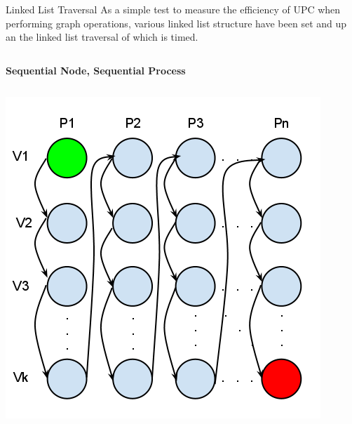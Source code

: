 \documentclass[final]{beamer} %
\begin{document}
\begin{frame}[t]
\begin{columns}[t]
\begin{column}{0.60\paperwidth}
				\begin{block}{Linked List Traversal}
					As a simple test to measure the efficiency of UPC when performing graph operations, various linked list structure have been set and up an the linked list traversal of which is timed.  
				\end{block}
				\begin{columns}[t,totalwidth=0.60\paperwidth]
					\begin{column}{0.28\paperwidth}
						\begin{center} \bf{Sequential Node, Sequential Process} \end{center}
						\begin{columns}[t,totalwidth=0.28\paperwidth]
							\begin{column}{0.12\paperwidth}
								\begin{center} \includegraphics[width=0.12\paperwidth]{img/linked_list/seq_node_seq_proc} \end{center}
							\end{column}
							\begin{column}{0.12\paperwidth}

\end{column}
\end{columns}
\end{column}
\end{columns}
\end{column}
\end{columns}
\end{frame}
\end{document}
